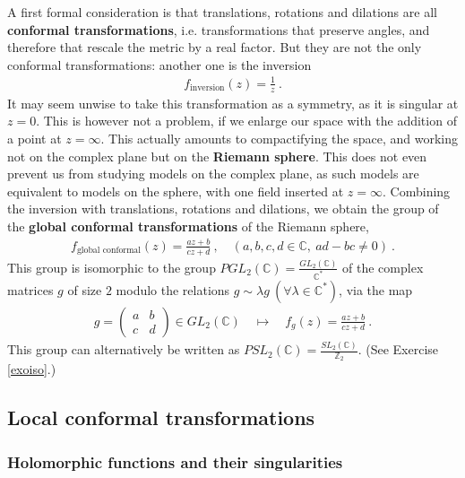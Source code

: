 \documentclass[12pt, a4paper, notitlepage, twoside]{report}
\numberwithin{equation}{section}
\theoremstyle{break}
\begin{document}
A first formal consideration is that translations, rotations and dilations are all \textbf{\boldmath conformal transformations}, i.e. transformations that preserve angles, and therefore that rescale the metric by a real factor.
But they are not the only conformal transformations: another one is the inversion
\begin{align}
 f_\text{inversion}(z) = \frac{1}{z}\ .
\end{align}
It may seem unwise to take this transformation as a symmetry, as it is singular at $z=0$.
This is however not a problem, if we enlarge our space with the addition of a point at $z=\infty$.
This actually amounts to compactifying the space, and working not on the complex plane but on the \textbf{\boldmath Riemann sphere}.
This does not even prevent us from studying models on the complex plane, as such models are equivalent to models on the sphere, with one field inserted at $z=\infty$.
Combining the inversion with translations, rotations and dilations, we obtain the group of the \textbf{\boldmath global conformal transformations} of the Riemann sphere,
\begin{align}
 \boxed{f_\text{global conformal}(z)  = \frac{az+b}{cz+d}}\ , \quad (a,b,c,d\in\mathbb{C},\ ad-bc\neq 0)\ .
\end{align}
This group is isomorphic to the group $PGL_2({\mathbb{C}})=\frac{GL_2({\mathbb{C}})}{\mathbb{C}^*}$ of the complex matrices $g$ of size $2$ modulo the relations $g\sim \lambda g\ (\forall \lambda\in\mathbb{C}^*)$, via the map
\begin{align}
 g = \left(\begin{array}{cc} a & b \\ c & d \end{array}\right) \in GL_2({\mathbb{C}}) \quad \longmapsto\quad f_g(z) = \frac{az+b}{cz+d}\ .
\label{gisl}
\end{align}
This group can alternatively be written as $PSL_2(\mathbb{C}) = \frac{SL_2(\mathbb{C})}{\mathbb{Z}_2}$.
(See Exercise \ref{exoiso}.) 


\subsection{Local conformal transformations \label{secloc}}

\subsubsection{Holomorphic functions and their singularities}
\end{document}
